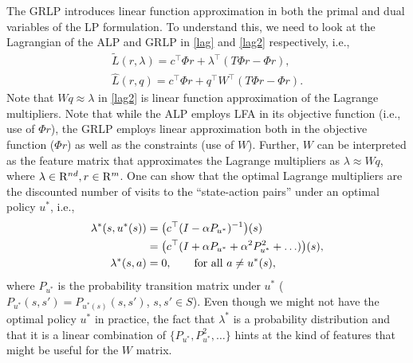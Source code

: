 The GRLP introduces linear function approximation in both the primal and dual variables of the LP formulation. 
To understand this, we need to look at the Lagrangian of the ALP and GRLP in \eqref{lag} and \eqref{lag2} respectively, i.e., 
\begin{align}\label{lag}
\tilde{L}(r,\lambda)=c^\top \Phi r+\lambda^\top (T\Phi r-\Phi r), \\ \label{lag2}\hat{L}(r,q)=c^\top \Phi r+q^\top W^\top (T\Phi r-\Phi r).
\end{align}
Note that $ Wq\approx \lambda$ in \eqref{lag2} is linear function approximation of the Lagrange multipliers. Note that while the ALP employs LFA in its objective function (i.e., use of $\Phi r$), the GRLP employs linear approximation both in the objective function ($\Phi r$) as well as the constraints (use of $W$). Further, $W$ can be interpreted as the feature matrix that approximates the Lagrange multipliers as $\lambda\approx Wq$, where $\lambda \in \mathrm{R}^{nd}, r\in \mathrm{R}^m$. One can show \cite{dolgov} that the optimal Lagrange multipliers are the discounted number of visits to the ``state-action pairs'' under an optimal policy $u^*$, i.e., 
\begin{align}
\lambda^*(s,u^*(s))&=\big(c^\top(I-\alpha P_{u^*})^{-1}\big)(s)\nonumber\\
				&= \big(c^\top(I+\alpha P_{u^*}+\alpha^2 P_{u^*}^2+\ldots)\big)(s),\nonumber\\
			\lambda^*(s,a)&=0, \qquad \text{for all } a \neq u^*(s),\nonumber
\end{align}
where $P_{u^*}$ is the probability transition matrix under $u^*$ ($P_{u^*}(s,s') = P_{u^*(s)}(s,s')$, $s,s'\in S$). Even though we might not have the optimal policy $u^*$ in practice, the fact that $\lambda^*$ is a probability distribution and that it is a linear combination of $\{P_{u^*},P^2_{u^*},\ldots\}$ hints at the kind of features that might be useful for the $W$ matrix.
